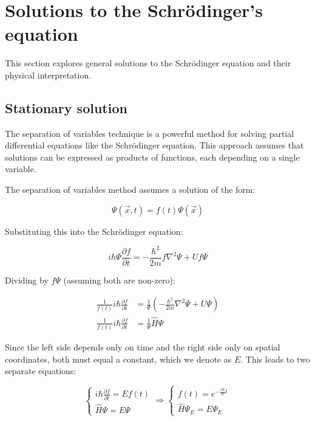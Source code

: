 \documentclass[italian]{HKNdocument}
\begin{document}
\section{Solutions to the Schrödinger's equation}

This section explores general solutions to the Schrödinger equation and their physical interpretation.

\subsection{Stationary solution}

The separation of variables technique is a powerful method for solving partial differential equations like the Schrödinger equation. This approach assumes that solutions can be expressed as products of functions, each depending on a single variable.


The separation of variables method assumes a solution of the form:

\begin{equation}
\Psi(\vec{x}, t) = f(t)\Psi(\vec{x})
\end{equation}

Substituting this into the Schrödinger equation:

\begin{equation}
i\hbar\Psi\frac{\partial f}{\partial t} = -\frac{\hbar^2}{2m}f\nabla^2\Psi + Uf\Psi
\end{equation}

Dividing by $f\Psi$ (assuming both are non-zero):

\begin{align}
\frac{1}{f(t)}i\hbar\frac{\partial f}{\partial t} &= \frac{1}{\Psi}\left(-\frac{\hbar^2}{2m}\nabla^2\Psi + U\Psi\right) \\
\frac{1}{f(t)}i\hbar\frac{\partial f}{\partial t} &= \frac{1}{\Psi}\hat{H}\Psi
\end{align}

Since the left side depends only on time and the right side only on spatial coordinates, both must equal a constant, which we denote as $E$. This leads to two separate equations:

\[
\left\{\begin{array}{l}
i\hbar\frac{\partial f}{\partial t} = Ef(t) \\
\hat{H}\Psi = E\Psi
\end{array}\right. \Rightarrow \left\{\begin{array}{l}
f(t) = e^{-\frac{iE}{\hbar}t} \\
\hat{H}\Psi_E = E\Psi_E
\end{array}\right.
\]
\end{document}
